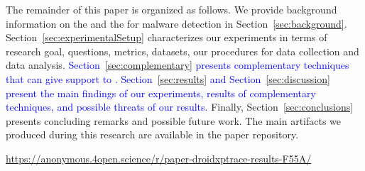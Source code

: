 
The remainder of this paper is organized as follows. 
We provide background information on the \mas and the \mas for malware detection in
Section~\ref{sec:background}. Section~\ref{sec:experimentalSetup}
characterizes our experiments in terms of research goal, questions, metrics, datasets, our procedures for data collection and data analysis. \textcolor{blue}{Section~\ref{sec:complementary} presents complementary techniques that can give support to \mas. Section~\ref{sec:results} and Section~\ref{sec:discussion} present the main findings of our experiments, results of complementary techniques, and possible threats of our results.} Finally,
Section~\ref{sec:conclusions} presents concluding remarks and possible future
work. The main artifacts we produced during this research are available in the
paper repository.

\begin{small}
  \begin{center}
    \url{https://anonymous.4open.science/r/paper-droidxptrace-results-F55A/}
  \end{center}
\end{small}
